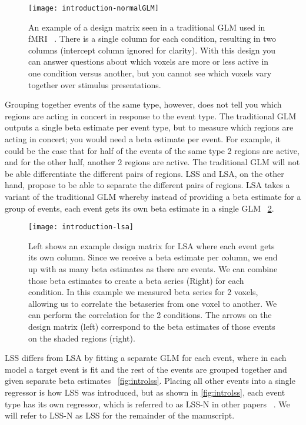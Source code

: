 \documentclass[10pt,letterpaper]{article}
\begin{document}
\begin{figure}[H]
  \centering
  \texttt{[image: introduction-normalGLM]}
  \caption{
    An example of a design matrix seen in a traditional GLM used in fMRI ~\cite{Friston1995}.
    There is a single column for each condition, resulting in two columns (intercept column ignored for clarity).
    With this design you can answer questions about which voxels are more or less active in one condition
    versus another, but you cannot see which voxels vary together over stimulus presentations.
  }
  \label{fig:introGLM}
\end{figure}

Grouping together events of the same type, however, does not tell you which regions are acting in concert
in response to the event type.
The traditional GLM outputs a single beta estimate per event type, but to measure which regions
are acting in concert; you would need a beta estimate per event.
For example, it could be the case that for half of the events of the same type 2 regions are active,
and for the other half, another 2 regions are active.
The traditional GLM will not be able differentiate the different pairs of regions.
LSS and LSA, on the other hand, propose to be able to separate the different pairs of regions.
LSA takes a variant of the traditional GLM whereby instead of providing a beta
estimate for a group of events, each event gets its own beta estimate in a single GLM ~\ref{fig:introlsa}.

\begin{figure}[H]
  \centering
  \texttt{[image: introduction-lsa]}
  \caption{
    Left shows an example design matrix for LSA where each event gets its own column.
    Since we receive a beta estimate per column, we end up with as many beta estimates as there
    are events.
    We can combine those beta estimates to create a beta series (Right) for each condition.
    In this example we measured beta series for 2 voxels, allowing us to
    correlate the betaseries from one voxel to another.
    We can perform the correlation for the 2 conditions.
    The arrows on the design matrix (left) correspond to the beta estimates of those events
    on the shaded regions (right).
  }
  \label{fig:introlsa}
\end{figure}

LSS differs from LSA by fitting a separate GLM for each event, where in each model a target
event is fit and the rest of the events are grouped together and given separate beta estimates ~\ref{fig:introlss}.
Placing all other events into a single regressor is how LSS was introduced, but as shown in \ref{fig:introlss},
each event type has its own regressor, which is referred to as LSS-N in other papers ~\cite{Abdulrahman2016,Mumford2012}.
We will refer to LSS-N as LSS for the remainder of the manuscript.
\end{document}
